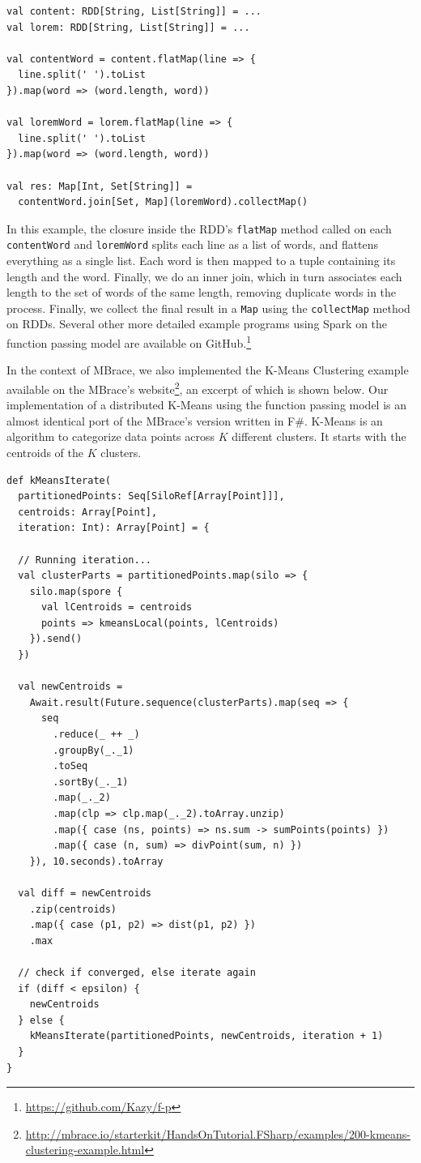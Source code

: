 \documentclass[10pt]{sigplanconf}
\theoremstyle{definition}
\theoremstyle{definition}
\begin{document}
\begin{lstlisting}
val content: RDD[String, List[String]] = ...
val lorem: RDD[String, List[String]] = ...

val contentWord = content.flatMap(line => {
  line.split(' ').toList
}).map(word => (word.length, word))

val loremWord = lorem.flatMap(line => {
  line.split(' ').toList
}).map(word => (word.length, word))

val res: Map[Int, Set[String]] =
  contentWord.join[Set, Map](loremWord).collectMap()
\end{lstlisting}

In this example, the closure inside the RDD's \verb|flatMap| method called on
each \verb|contentWord| and \verb|loremWord| splits each line as a list of
words, and flattens everything as a single list. Each word is then mapped to a
tuple containing its length and the word. Finally, we do an inner join, which in
turn associates each length to the set of words of the same length, removing
duplicate words in the process. Finally, we collect the final result in a
\verb|Map| using the \verb|collectMap| method on RDDs. Several other more
detailed example programs using Spark on the function passing model are
available on GitHub.\footnote{\url{https://github.com/Kazy/f-p}}

In the context of MBrace, we also implemented the K-Means Clustering example
available on the MBrace's
website\footnote{\url{http://mbrace.io/starterkit/HandsOnTutorial.FSharp/examples/200-kmeans-clustering-example.html}},
an excerpt of which is shown below. Our implementation of a distributed K-Means
using the function passing model is an almost identical port of the MBrace’s
version written in F\#. K-Means is an algorithm to categorize data points across
$K$ different clusters. It starts with the centroids of the $K$ clusters.

\begin{lstlisting}
def kMeansIterate(
  partitionedPoints: Seq[SiloRef[Array[Point]]],
  centroids: Array[Point],
  iteration: Int): Array[Point] = {

  // Running iteration...
  val clusterParts = partitionedPoints.map(silo => {
    silo.map(spore {
      val lCentroids = centroids
      points => kmeansLocal(points, lCentroids)
    }).send()
  })

  val newCentroids =
    Await.result(Future.sequence(clusterParts).map(seq => {
      seq
        .reduce(_ ++ _)
        .groupBy(_._1)
        .toSeq
        .sortBy(_._1)
        .map(_._2)
        .map(clp => clp.map(_._2).toArray.unzip)
        .map({ case (ns, points) => ns.sum -> sumPoints(points) })
        .map({ case (n, sum) => divPoint(sum, n) })
    }), 10.seconds).toArray

  val diff = newCentroids
    .zip(centroids)
    .map({ case (p1, p2) => dist(p1, p2) })
    .max

  // check if converged, else iterate again
  if (diff < epsilon) {
    newCentroids
  } else {
    kMeansIterate(partitionedPoints, newCentroids, iteration + 1)
  }
}
\end{lstlisting}
\end{document}
